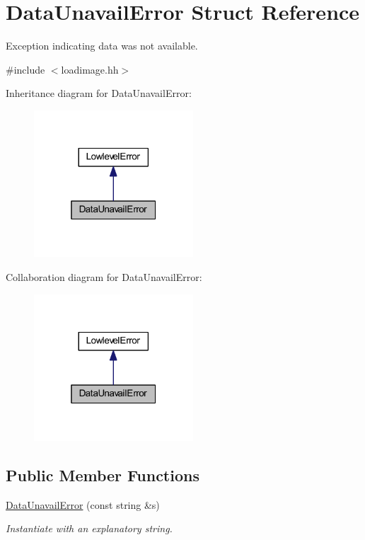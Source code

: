\hypertarget{struct_data_unavail_error}{}\section{Data\+Unavail\+Error Struct Reference}
\label{struct_data_unavail_error}


Exception indicating data was not available.  




{\ttfamily \#include $<$loadimage.\+hh$>$}



Inheritance diagram for Data\+Unavail\+Error\+:
\nopagebreak
\begin{figure}[H]
\begin{center}
\leavevmode
\includegraphics[width=169pt]{struct_data_unavail_error__inherit__graph}
\end{center}
\end{figure}


Collaboration diagram for Data\+Unavail\+Error\+:
\nopagebreak
\begin{figure}[H]
\begin{center}
\leavevmode
\includegraphics[width=169pt]{struct_data_unavail_error__coll__graph}
\end{center}
\end{figure}
\subsection*{Public Member Functions}
\begin{DoxyCompactItemize}
\item 
\mbox{\hyperlink{struct_data_unavail_error_a7f0121dd30d632c3ad343a824718f90d}{Data\+Unavail\+Error}} (const string \&s)
\begin{DoxyCompactList}\small\item\em Instantiate with an explanatory string. \end{DoxyCompactList}\end{DoxyCompactItemize}
